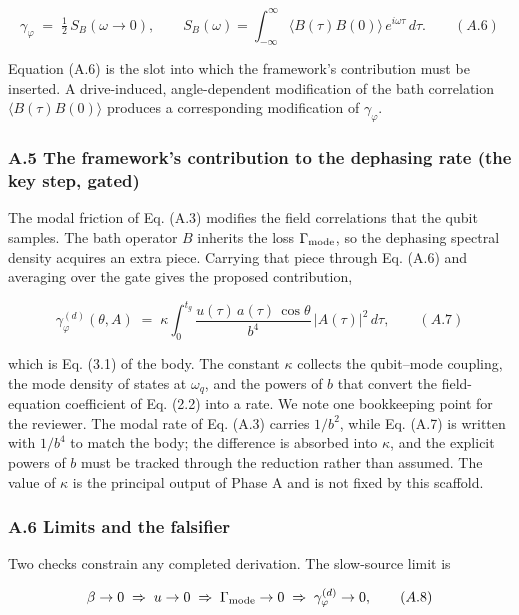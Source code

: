 \documentclass[
  11pt,
]{article}
\begin{document}
\[
\gamma_\varphi \;=\; \tfrac12\,S_B(\omega\to 0), \qquad S_B(\omega)=\int_{-\infty}^{\infty}\!\langle B(\tau)B(0)\rangle\,e^{i\omega\tau}\,d\tau. \qquad (A.6)
\]

Equation (A.6) is the slot into which the framework's contribution must
be inserted. A drive-induced, angle-dependent modification of the bath
correlation \(\langle B(\tau)B(0)\rangle\) produces a corresponding
modification of \(\gamma_\varphi\).

\hypertarget{a.5-the-frameworks-contribution-to-the-dephasing-rate-the-key-step-gated}{%
\subsubsection{A.5 The framework's contribution to the dephasing rate
(the key step,
gated)}\label{a.5-the-frameworks-contribution-to-the-dephasing-rate-the-key-step-gated}}

The modal friction of Eq. (A.3) modifies the field correlations that the
qubit samples. The bath operator \(B\) inherits the loss
\(\Gamma_{\rm mode}\), so the dephasing spectral density acquires an
extra piece. Carrying that piece through Eq. (A.6) and averaging over
the gate gives the proposed contribution,

\[
\gamma_\varphi^{(d)}(\theta,A) \;=\; \kappa \int_0^{t_g} \frac{u(\tau)\,a(\tau)\,\cos\theta}{b^4}\,\big|A(\tau)\big|^2\,d\tau, \qquad (A.7)
\]

which is Eq. (3.1) of the body. The constant \(\kappa\) collects the
qubit--mode coupling, the mode density of states at \(\omega_q\), and
the powers of \(b\) that convert the field-equation coefficient of Eq.
(2.2) into a rate. We note one bookkeeping point for the reviewer. The
modal rate of Eq. (A.3) carries \(1/b^2\), while Eq. (A.7) is written
with \(1/b^4\) to match the body; the difference is absorbed into
\(\kappa\), and the explicit powers of \(b\) must be tracked through the
reduction rather than assumed. The value of \(\kappa\) is the principal
output of Phase A and is not fixed by this scaffold.

\hypertarget{a.6-limits-and-the-falsifier}{%
\subsubsection{A.6 Limits and the
falsifier}\label{a.6-limits-and-the-falsifier}}

Two checks constrain any completed derivation. The slow-source limit is

\[
\beta\to 0 \;\Rightarrow\; u\to 0 \;\Rightarrow\; \Gamma_{\rm mode}\to 0 \;\Rightarrow\; \gamma_\varphi^{(d)}\to 0, \qquad (A.8)
\]
\end{document}
